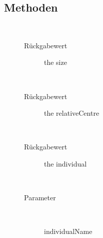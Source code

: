 \subsection{Methoden}
\begin{description}
\item[{\label{ontologyFramework.OFDataMapping.ReservatedDataType.TimeWindow.getSize()}}]
~ 
\begin{description}
\item[Rückgabewert] 
the size
\end{description}
\item[{\label{ontologyFramework.OFDataMapping.ReservatedDataType.TimeWindow.getRelativeCentre()}}]
~ 
\begin{description}
\item[Rückgabewert] 
the relativeCentre
\end{description}
\item[{\label{ontologyFramework.OFDataMapping.ReservatedDataType.TimeWindow.getIndividualName()}}]
~ 
\begin{description}
\item[Rückgabewert] 
the individual
\end{description}
\item[{\label{ontologyFramework.OFDataMapping.ReservatedDataType.TimeWindow.setIndividualName(java.lang.String)}}]
~ 
\begin{description}
\item[Parameter] ~
\begin{description}
\item[individualName]


\end{description}
\end{description}
\end{description}
